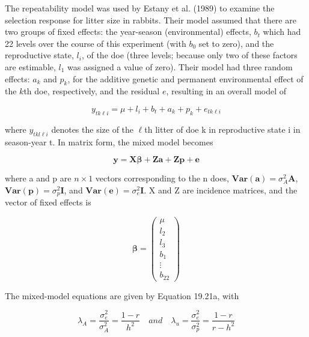\documentclass{article}
\begin{document}
The repeatability model was used by Estany et al. (1989) to examine the selection response for litter size in rabbits. Their model assumed that there are two groups of fixed effects: the year-season (environmental) effects,  $ b_t $ which had 22 levels over the course of this experiment (with  $ b_0 $ set to zero), and the reproductive state,  $ l_i $, of the doe (three levels; because only two of these factors are estimable,  $ l_1 $ was assigned a value of zero). Their model had three random effects:  $ a_k $ and  $ p_k $, for the additive genetic and permanent environmental effect of the  $ k $th doe, respectively, and the residual  $ e $, resulting in an overall model of

\begin{equation}
y_{t k\ell i}=\mu+l_{i}+b_{t}+a_{k}+p_{k}+e_{t k\ell i}
\end{equation}

where  $ y_{tkl\ell i} $ denotes the size of the  $ \ell $th litter of doe k in reproductive state i in season-year t. In matrix form, the mixed model becomes

\begin{equation}
\mathbf{y}=\mathbf{X}\boldsymbol{\beta}+\mathbf{Z}\mathbf{a}+\mathbf{Z}\mathbf{p}+\mathbf{e}
\end{equation}

where a and p are  $ n \times 1 $ vectors corresponding to the n does,  $ \mathbf{Var}(\mathbf{a}) = \sigma_A^2 \mathbf{A} $,  $ \mathbf{Var}(\mathbf{p}) = \sigma_p^2 \mathbf{I} $, and  $ \mathbf{Var}(\mathbf{e}) = \sigma_e^2 \mathbf{I} $. X and Z are incidence matrices, and the vector of fixed effects is

\begin{equation}
\boldsymbol{\beta}=\begin{pmatrix}\mu\\ l_{2}\\ l_{3}\\ b_{1}\\ \vdots\\ b_{22}\end{pmatrix}
\end{equation}

The mixed-model equations are given by Equation 19.21a, with

\begin{equation}
\lambda_{A}=\frac{\sigma_{e}^{2}}{\sigma_{A}^{2}}=\frac{1-r}{h^{2}}\quad and\quad\lambda_{u}=\frac{\sigma_{e}^{2}}{\sigma_{p}^{2}}=\frac{1-r}{r-h^{2}}
\end{equation}
\end{document}
